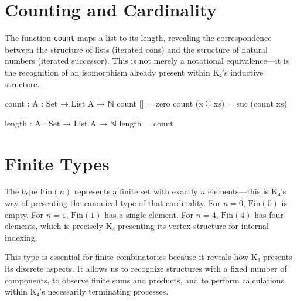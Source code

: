 \documentclass[11pt,a4paper]{book}
\begin{document}
\section{Counting and Cardinality}

The function \texttt{count} maps a list to its length, revealing the correspondence
between the structure of lists (iterated cons) and the structure of natural numbers
(iterated successor). This is not merely a notational equivalence—it is the recognition of an isomorphism
already present within K₄'s inductive structure.

\begin{code}
count : {A : Set} → List A → ℕ
count []       = zero
count (x ∷ xs) = suc (count xs)

length : {A : Set} → List A → ℕ
length = count
\end{code}

\section{Finite Types}

The type $\mathrm{Fin}(n)$ represents a finite set with exactly $n$ elements—this is K₄'s way of presenting
the canonical type of that cardinality. For $n = 0$, $\mathrm{Fin}(0)$ is empty. For
$n = 1$, $\mathrm{Fin}(1)$ has a single element. For $n = 4$, $\mathrm{Fin}(4)$ has
four elements, which is precisely K₄ presenting its vertex structure for internal indexing.

This type is essential for finite combinatorics because it reveals how K₄ presents its discrete aspects. It allows us to recognize
structures with a fixed number of components, to observe finite sums and products,
and to perform calculations within K₄'s necessarily terminating processes.
\end{document}
